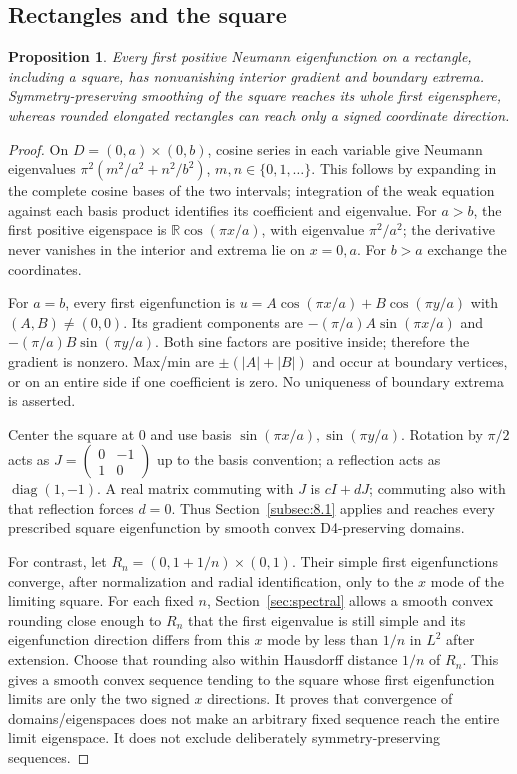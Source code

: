 \documentclass[11pt]{article}
\newtheorem{proposition}[theorem]{Proposition}
\theoremstyle{definition}
\theoremstyle{remark}
\numberwithin{equation}{section}
\begin{document}
\subsection{Rectangles and the square}\label{subsec:8.2}
\begin{proposition}\label{prop:rectangles}
Every first positive Neumann eigenfunction on a rectangle, including a square, has nonvanishing interior gradient and boundary extrema. Symmetry-preserving smoothing of the square reaches its whole first eigensphere, whereas rounded elongated rectangles can reach only a signed coordinate direction.
\end{proposition}
\begin{proof}

On $D=(0,a)\times(0,b)$, cosine series in each variable give Neumann eigenvalues $\pi^2(m^2/a^2+n^2/b^2)$, $m,n\in\{0,1,\ldots\}$. This follows by expanding in the complete cosine bases of the two intervals; integration of the weak equation against each basis product identifies its coefficient and eigenvalue. For $a>b$, the first positive eigenspace is $\mathbb R\cos(\pi x/a)$, with eigenvalue $\pi^2/a^2$; the derivative never vanishes in the interior and extrema lie on $x=0,a$. For $b>a$ exchange the coordinates.

For $a=b$, every first eigenfunction is $u=A\cos(\pi x/a)+B\cos(\pi y/a)$ with $(A,B)\ne(0,0)$. Its gradient components are $-(\pi/a)A\sin(\pi x/a)$ and $-(\pi/a)B\sin(\pi y/a)$. Both sine factors are positive inside; therefore the gradient is nonzero. Max/min are $\pm(|A|+|B|)$ and occur at boundary vertices, or on an entire side if one coefficient is zero. No uniqueness of boundary extrema is asserted.

Center the square at 0 and use basis $\sin(\pi x/a),\sin(\pi y/a)$. Rotation by $\pi/2$ acts as $J=\begin{pmatrix}0&-1\\1&0\end{pmatrix}$ up to the basis convention; a reflection acts as $\operatorname{diag}(1,-1)$. A real matrix commuting with $J$ is $cI+dJ$; commuting also with that reflection forces $d=0$. Thus Section~\ref{subsec:8.1} applies and reaches every prescribed square eigenfunction by smooth convex D4-preserving domains.

For contrast, let $R_n=(0,1+1/n)\times(0,1)$. Their simple first eigenfunctions converge, after normalization and radial identification, only to the $x$ mode of the limiting square. For each fixed $n$, Section~\ref{sec:spectral} allows a smooth convex rounding close enough to $R_n$ that the first eigenvalue is still simple and its eigenfunction direction differs from this $x$ mode by less than $1/n$ in $L^2$ after extension. Choose that rounding also within Hausdorff distance $1/n$ of $R_n$. This gives a smooth convex sequence tending to the square whose first eigenfunction limits are only the two signed $x$ directions. It proves that convergence of domains/eigenspaces does not make an arbitrary fixed sequence reach the entire limit eigenspace. It does not exclude deliberately symmetry-preserving sequences.

\end{proof}
\end{document}
